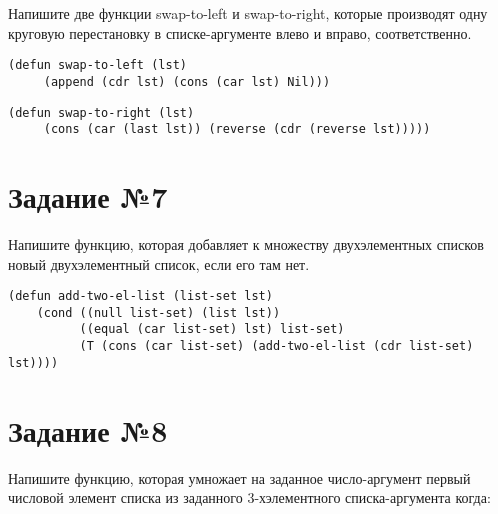 Напишите две функции swap-to-left и swap-to-right, которые производят одну
круговую перестановку в списке-аргументе влево и вправо, соответственно.

\vspace{4mm}
\begin{minipage}{0.92\linewidth}
\begin{lstlisting}
(defun swap-to-left (lst)
     (append (cdr lst) (cons (car lst) Nil)))
\end{lstlisting}
\end{minipage}

\vspace{4mm}
\begin{minipage}{0.92\linewidth}
\begin{lstlisting}
(defun swap-to-right (lst)
     (cons (car (last lst)) (reverse (cdr (reverse lst)))))
\end{lstlisting}
\end{minipage}

\section{Задание №7}

Напишите функцию, которая добавляет к множеству двухэлементных списков
новый двухэлементный список, если его там нет.

\vspace{4mm}
\begin{minipage}{0.92\linewidth}
\begin{lstlisting}
(defun add-two-el-list (list-set lst)
    (cond ((null list-set) (list lst))
          ((equal (car list-set) lst) list-set)
          (T (cons (car list-set) (add-two-el-list (cdr list-set) lst))))
\end{lstlisting}
\end{minipage}

\section{Задание №8}

Напишите функцию, которая умножает на заданное число-аргумент первый
числовой элемент списка из заданного 3-хэлементного списка-аргумента
когда:

